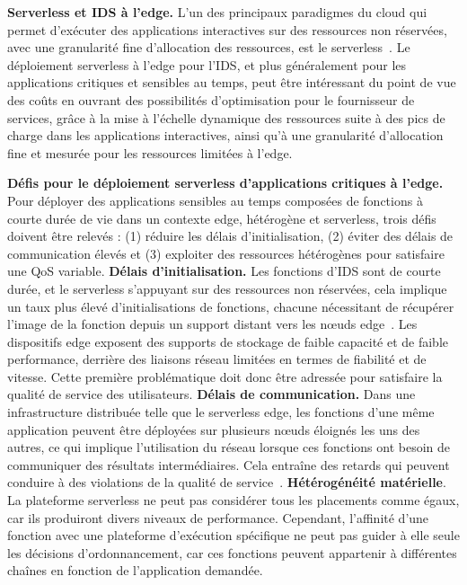 \textbf{Serverless et IDS à l'edge.} L'un des principaux paradigmes du cloud qui permet d'exécuter des applications interactives sur des ressources non réservées, avec une granularité fine d'allocation des ressources, est le serverless~\cite{Lannurien2023}. Le déploiement serverless à l'edge pour l'IDS, et plus généralement pour les applications critiques et sensibles au temps, peut être intéressant du point de vue des coûts en ouvrant des possibilités d'optimisation pour le fournisseur de services, grâce à la mise à l'échelle dynamique des ressources suite à des pics de charge dans les applications interactives, ainsi qu'à une granularité d'allocation fine et mesurée pour les ressources limitées à l'edge.

\textbf{Défis pour le déploiement serverless d'applications critiques à l'edge.} Pour déployer des applications sensibles au temps composées de fonctions à courte durée de vie dans un contexte edge, hétérogène et serverless, trois défis doivent être relevés : (1) réduire les délais d'initialisation, (2) éviter des délais de communication élevés et (3) exploiter des ressources hétérogènes pour satisfaire une QoS variable.
\textbf{Délais d'initialisation.} Les fonctions d'IDS sont de courte durée, et le serverless s'appuyant sur des ressources non réservées, cela implique un taux plus élevé d'initialisations de fonctions, chacune nécessitant de récupérer l'image de la fonction depuis un support distant vers les nœuds edge~\cite{yanHermesEfficientCache2020}. Les dispositifs edge exposent des supports de stockage de faible capacité et de faible performance, derrière des liaisons réseau limitées en termes de fiabilité et de vitesse. Cette première problématique doit donc être adressée pour satisfaire la qualité de service des utilisateurs.
\textbf{Délais de communication.} Dans une infrastructure distribuée telle que le serverless edge, les fonctions d'une même application peuvent être déployées sur plusieurs nœuds éloignés les uns des autres, ce qui implique l'utilisation du réseau lorsque ces fonctions ont besoin de communiquer des résultats intermédiaires. Cela entraîne des retards qui peuvent conduire à des violations de la qualité de service~\cite{wawrzoniakBoxerDataAnalytics2021a}.
\textbf{Hétérogénéité matérielle}. La plateforme serverless ne peut pas considérer tous les placements comme égaux, car ils produiront divers niveaux de performance. Cependant, l'affinité d'une fonction avec une plateforme d'exécution spécifique ne peut pas guider à elle seule les décisions d'ordonnancement, car ces fonctions peuvent appartenir à différentes chaînes en fonction de l'application demandée.

